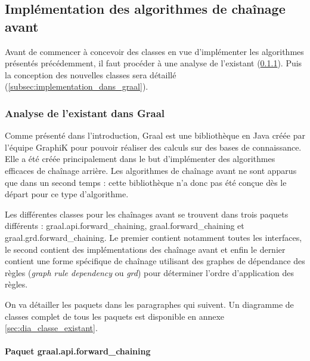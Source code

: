     \subsection{Implémentation des algorithmes de chaînage avant}\label{subsec:implementation_chainage_avant}
    
    Avant de commencer à concevoir des classes en vue d'implémenter les algorithmes présentés précédemment, il faut procéder à une analyse de l'existant (\ref{subsubsec:analyse_existant_graal}). Puis la conception des nouvelles classes sera détaillé (\ref{subsec:implementation_dans_graal}).
    
     \subsubsection{Analyse de l'existant dans Graal}\label{subsubsec:analyse_existant_graal}
    
       
        
        Comme présenté dans l'introduction, Graal est une bibliothèque en Java créée par l'équipe GraphiK pour pouvoir réaliser des calculs sur des bases de connaissance. Elle a été créée principalement dans le but d'implémenter des algorithmes efficaces de chaînage arrière. Les algorithmes de chaînage avant ne sont apparus que dans un second temps : cette bibliothèque n'a donc pas été conçue dès le départ pour ce type d'algorithme.
        \par Les différentes classes pour les chaînages avant se trouvent dans trois paquets différents : graal.api.forward\_chaining, graal.forward\_chaining et graal.grd.forward\_chaining. Le premier contient notamment toutes les interfaces, le second contient des implémentations des chaînage avant et enfin le dernier contient une forme spécifique de chaînage utilisant des graphes de dépendance des règles (\textit{graph rule dependency} ou \textit{grd}) pour déterminer l'ordre d'application des règles.
        \par On va détailler les paquets dans les paragraphes qui suivent. Un diagramme de classes complet de tous les paquets est disponible en annexe \ref{sec:dia_classe_existant}.
        
        \paragraph{Paquet graal.api.forward\_chaining} 
        
